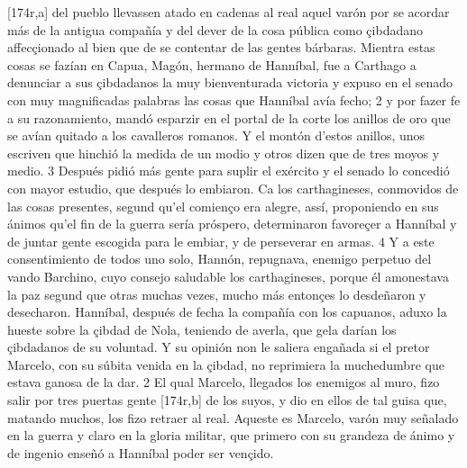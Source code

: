 \documentclass[11pt,twoside]{article}\makeatletter
\def\persName{}\def\name{}
\def\placeName{}
\begin{document}
[174r,a] del pueblo llevassen atado en cadenas al real aquel varón por se acordar más de la antigua compañía y del dever de la cosa pública como çibdadano affecçionado al bien que de se contentar de las gentes bárbaras.
\pend
{} Mientra estas cosas se fazían en Capua, Magón, hermano de  {\persName Hanníbal}, fue a  {\placeName Carthago} a denunciar a sus çibdadanos la muy bienventurada victoria y expuso en el senado con muy magnificadas palabras las cosas que  {\persName Hanníbal} avía fecho; 2 y por fazer fe a su razonamiento, mandó esparzir en el portal de la corte los anillos de oro que se avían quitado a los cavalleros romanos. Y el montón d’estos anillos, unos escriven que hinchió la medida de un modio y otros dizen que de tres moyos y medio. 3 Después pidió más gente para suplir el exército y el senado lo concedió con mayor estudio, que después lo embiaron. Ca los  {\name carthagineses}, conmovidos de las cosas presentes, segund qu’el comienço era alegre, assí, proponiendo en sus ánimos qu’el fin de la guerra sería próspero, determinaron favoreçer a  {\persName Hanníbal} y de juntar gente escogida para le embiar, y de perseverar en armas. 4 Y a este consentimiento de todos uno solo,  {\persName Hannón}, repugnava, enemigo perpetuo del vando Barchino, cuyo consejo saludable los  {\name carthagineses}, porque él amonestava la paz segund que otras muchas vezes, mucho más entonçes lo desdeñaron y desecharon.
\pend
{}  {\persName Hanníbal}, después de fecha la compañía con los capuanos, aduxo la hueste sobre la çibdad de Nola, teniendo  de averla, que gela darían los çibdadanos de su voluntad. Y su opinión non le saliera engañada si el pretor Marcelo, con su súbita venida en la çibdad, no reprimiera la muchedumbre que estava ganosa de la dar. 2 El qual Marcelo, llegados los enemigos al muro, fizo salir por tres puertas gente %
[174r,b] de los suyos, y dio en ellos de tal guisa que, matando muchos, los fizo retraer al real. Aqueste es Marcelo, varón muy señalado en la guerra y claro en la gloria militar, que primero con su grandeza de ánimo y de ingenio enseñó a  {\persName Hanníbal} poder ser vençido.
\pend
\pstart
\end{document}
